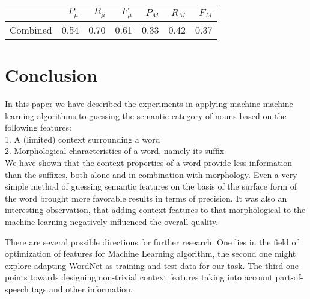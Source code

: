 \documentclass[letterpaper]{article}
\begin{document}
\begin{tabular}{|r|r|r|r|r|r|r|}
 \hline
 & $P_\mu$ & $R_\mu$ & $F_\mu$ & $P_M$ & $R_M$  & $F_M$ \\ \hline
Combined & 0.54 & 0.70 & 0.61 & 0.33 & 0.42 & 0.37 \\ \hline
\end{tabular}



\section{Conclusion}
In this paper we have described the experiments in applying machine machine learning algorithms
to guessing the semantic category of nouns based on the following features:\\
1. A (limited) context surrounding a word  \\
2. Morphological characteristics of a word, namely its suffix\\

We have shown that the context properties of a word
provide less information than the suffixes, both alone and in combination with morphology. 
Even a very simple method of guessing semantic features on the
basis of the surface form of the word brought more favorable %
results in terms of precision. It was also an interesting observation, that
adding context features to that morphological to the machine learning
negatively influenced the overall quality.

There are several possible directions for further research. One lies in the field of
optimization of features for Machine Learning algorithm, the second one might explore 
adapting WordNet as training and test data for our task. The third one points towards
designing non-trivial context features taking into account part-of-speech tags and other information.


 
\end{document}
